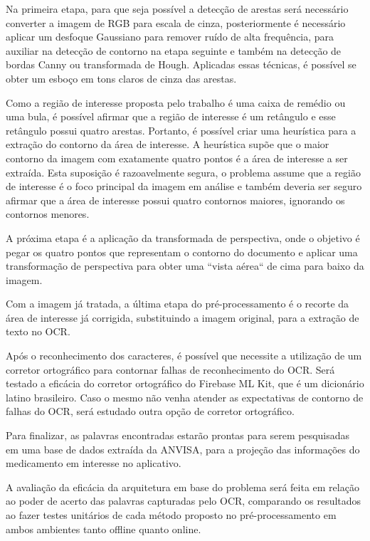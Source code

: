 Na primeira etapa, para que seja possível a detecção de arestas será necessário converter a imagem de RGB para escala de cinza, posteriormente é necessário aplicar um desfoque Gaussiano para remover ruído de alta frequência, para auxiliar na detecção de contorno na etapa seguinte e também na detecção de bordas Canny ou transformada de Hough. Aplicadas essas técnicas, é possível se obter um esboço em tons claros de cinza das arestas.

Como a região de interesse proposta pelo trabalho é uma caixa de remédio ou uma bula, é possível afirmar que a região de interesse é um retângulo e esse retângulo possui quatro arestas. Portanto, é possível criar uma heurística para a extração do contorno da área de interesse. A heurística supõe que o maior contorno da imagem com exatamente quatro pontos é a área de interesse a ser extraída. Esta suposição é razoavelmente segura, o problema assume que a região de interesse é o foco principal da imagem em análise e também deveria ser seguro afirmar que a área de interesse possui quatro contornos maiores, ignorando os contornos menores.

A próxima etapa é a aplicação da transformada de perspectiva, onde o objetivo é pegar os quatro pontos que representam o contorno do documento e aplicar uma transformação de perspectiva para obter uma ``vista aérea`` de cima para baixo da imagem.

Com a imagem já tratada, a última etapa do pré-processamento é o recorte da área de interesse já corrigida, substituindo a imagem original, para a extração de texto no OCR.

Após o reconhecimento dos caracteres, é possível que necessite a utilização de um corretor ortográfico para contornar falhas de reconhecimento do OCR. Será testado a eficácia do corretor ortográfico do Firebase ML Kit, que é um dicionário latino brasileiro. Caso o mesmo não venha atender as expectativas de contorno de falhas do OCR, será estudado outra opção de corretor ortográfico.

Para finalizar, as palavras encontradas estarão prontas para serem pesquisadas em uma base de dados extraída da ANVISA, para a projeção das informações do medicamento em interesse no aplicativo. 

A avaliação da eficácia da arquitetura em base do problema será feita em relação ao poder de acerto das palavras capturadas pelo OCR, comparando os resultados ao fazer testes unitários de cada método proposto no pré-processamento em ambos ambientes tanto offline quanto online.




